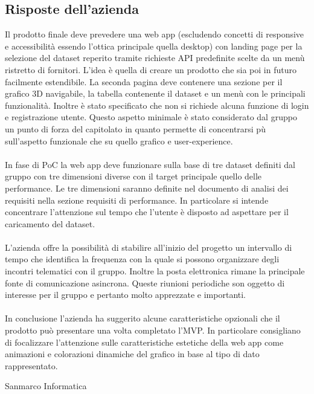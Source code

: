 \subsection{Risposte dell'azienda}
Il prodotto finale deve prevedere una web app (escludendo concetti di responsive e accessibilità essendo l'ottica principale quella desktop) con landing page per la selezione del dataset reperito tramite richieste API predefinite scelte da un menù ristretto di fornitori. L'idea è quella di creare un prodotto che sia poi in futuro facilmente estendibile. La seconda pagina deve contenere una sezione per il grafico 3D navigabile, la tabella contenente il dataset e un menù con le principali funzionalità.
Inoltre è stato specificato che non si richiede alcuna funzione di login e registrazione utente.
Questo aspetto minimale è stato considerato dal gruppo un punto di forza del capitolato in quanto permette di concentrarsi pù sull'aspetto funzionale che su quello grafico e user-experience.\\
\\
In fase di PoC la web app deve funzionare sulla base di tre dataset definiti dal gruppo con tre dimensioni diverse con il target principale quello delle performance. Le tre dimensioni saranno definite nel documento di analisi dei requisiti nella sezione requisiti di performance. In particolare si intende concentrare l'attenzione sul tempo che l'utente è disposto ad aspettare per il caricamento del dataset. \\
\\
L'azienda offre la possibilità di stabilire all'inizio del progetto un intervallo di tempo che identifica la frequenza con la quale si possono organizzare degli incontri telematici con il gruppo. Inoltre la posta elettronica rimane la principale fonte di comunicazione asincrona. Queste riunioni periodiche son oggetto di interesse per il gruppo e pertanto molto apprezzate e importanti. \\
\\
In conclusione l'azienda ha suggerito alcune caratteristiche opzionali che il prodotto può presentare una volta completato l'MVP. In particolare consigliano di focalizzare l'attenzione sulle caratteristiche estetiche della web app come animazioni e colorazioni dinamiche del grafico in base al tipo di dato rappresentato.

\hfill\signature{Approvazione esterna}{Sanmarco Informatica}
